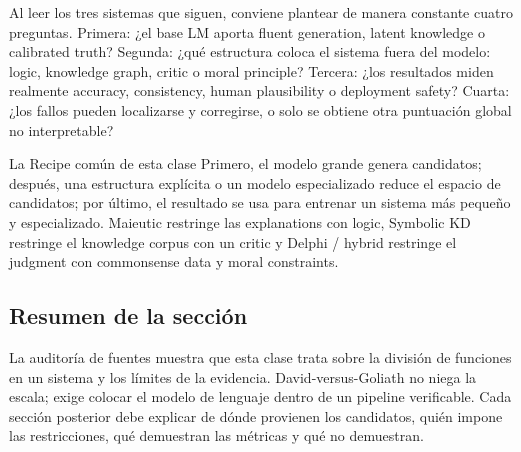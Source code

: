 Al leer los tres sistemas que siguen, conviene plantear de manera constante cuatro preguntas. Primera: ¿el base LM aporta fluent generation, latent knowledge o calibrated truth? Segunda: ¿qué estructura coloca el sistema fuera del modelo: logic, knowledge graph, critic o moral principle? Tercera: ¿los resultados miden realmente accuracy, consistency, human plausibility o deployment safety? Cuarta: ¿los fallos pueden localizarse y corregirse, o solo se obtiene otra puntuación global no interpretable?

\begin{importantbox}{La Recipe común de esta clase}
Primero, el modelo grande genera candidatos; después, una estructura explícita o un modelo especializado reduce el espacio de candidatos; por último, el resultado se usa para entrenar un sistema más pequeño y especializado. Maieutic restringe las explanations con logic, Symbolic KD restringe el knowledge corpus con un critic y Delphi / hybrid restringe el judgment con commonsense data y moral constraints.
\end{importantbox}

\subsection{Resumen de la sección}

La auditoría de fuentes muestra que esta clase trata sobre la división de funciones en un sistema y los límites de la evidencia. David-versus-Goliath no niega la escala; exige colocar el modelo de lenguaje dentro de un pipeline verificable. Cada sección posterior debe explicar de dónde provienen los candidatos, quién impone las restricciones, qué demuestran las métricas y qué no demuestran.
